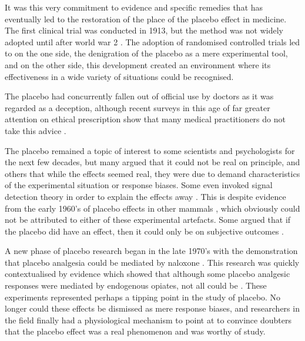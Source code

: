 It was this very commitment to evidence and specific remedies that has eventually led to the restoration of the place of the placebo effect in medicine. The first clinical trial was conducted in 1913, but the method was not widely adopted until after world war 2 \cite{Kaptchuk1998}. The adoption of randomised controlled trials led to on the one side, the denigration of the placebo as a mere experimental tool, and on the other side, this development created an environment where its effectiveness in a wide variety of situations could be recognised. 

The placebo had concurrently fallen out of official use  by doctors as it was regarded as a deception, although recent surveys in this age of far greater attention on ethical prescription show that many medical practitioners do not take this advice \cite{hrobjartsson2003use,sherman2008academic,tilburt2008prescribing,Sherman2008,Sherman2008a,Sherman2008b,Sherman2003,Ross1983,Buckalew1981,Krugman1964,Ross1962}. 


The placebo remained a topic of interest to some scientists and psychologists for the next few decades, but many argued that it could not be real on principle, and others that while the effects seemed real, they were due to demand characteristics of the experimental situation or response biases. Some even invoked signal detection theory in order to explain the effects away \cite{Allan2002}. This is despite evidence from the early 1960's of placebo effects in other mammals \cite{Herrnstein1962}, which obviously could not be attributed to either of these experimental artefacts. Some argued that if the placebo did have an effect, then it could only be on subjective outcomes \cite{Hrobjartsson2001}.

A new phase of placebo research began in the late 1970's with the demonstration that placebo analgesia could be mediated by naloxone \cite{Levine1978a,Levine1984,Fields1981,Gordon1981,Levine1979}. This research was quickly contextualised by evidence which showed that although some placebo analgesic responses were mediated by endogenous opiates, not all could be \cite{Gracely1983,Levine1984}. These experiments represented perhaps a tipping point in the study of placebo. No longer could these effects be dismissed as mere response biases, and researchers in the field finally had a physiological mechanism to point at to convince doubters that the placebo effect was a real phenomenon and was worthy of study. 

